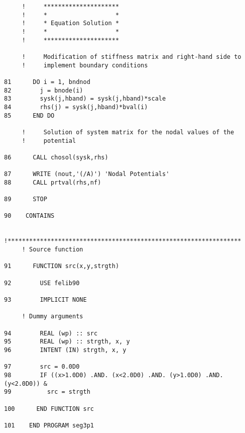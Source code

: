 \begin{verbatim}
     !     *********************
     !     *                   *
     !     * Equation Solution *
     !     *                   *
     !     *********************
     
     !     Modification of stiffness matrix and right-hand side to
     !     implement boundary conditions
     
81      DO i = 1, bndnod
82        j = bnode(i)
83        sysk(j,hband) = sysk(j,hband)*scale
84        rhs(j) = sysk(j,hband)*bval(i)
85      END DO
     
     !     Solution of system matrix for the nodal values of the
     !     potential
     
86      CALL chosol(sysk,rhs)
     
87      WRITE (nout,'(/A)') 'Nodal Potentials'
88      CALL prtval(rhs,nf)
     
89      STOP
     
90    CONTAINS
     
     !*****************************************************************
     ! Source function
     
91      FUNCTION src(x,y,strgth)
     
92        USE felib90
     
93        IMPLICIT NONE
     
     ! Dummy arguments
     
94        REAL (wp) :: src
95        REAL (wp) :: strgth, x, y
96        INTENT (IN) strgth, x, y
     
97        src = 0.0D0
98        IF ((x>1.0D0) .AND. (x<2.0D0) .AND. (y>1.0D0) .AND. (y<2.0D0)) &
99          src = strgth
     
100      END FUNCTION src
     
101    END PROGRAM seg3p1
\end{verbatim}